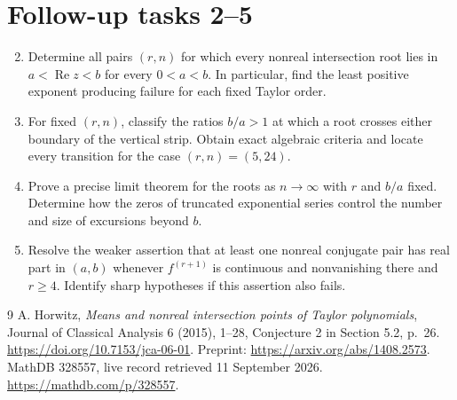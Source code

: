\documentclass[11pt]{article}
\begin{document}
\section{Follow-up tasks 2--5}
\begin{enumerate}
\setcounter{enumi}{1}
\renewcommand{\labelenumi}{\textbf{Task \arabic{enumi}.}}
\item Determine all pairs $(r,n)$ for which every nonreal intersection root
lies in $a<\operatorname{Re}z<b$ for every $0<a<b$. In particular, find the
least positive exponent producing failure for each fixed Taylor order.
\item For fixed $(r,n)$, classify the ratios $b/a>1$ at which a root crosses
either boundary of the vertical strip. Obtain exact algebraic criteria and
locate every transition for the case $(r,n)=(5,24)$.
\item Prove a precise limit theorem for the roots as $n\to\infty$ with $r$
and $b/a$ fixed. Determine how the zeros of truncated exponential series
control the number and size of excursions beyond $b$.
\item Resolve the weaker assertion that at least one nonreal conjugate pair
has real part in $(a,b)$ whenever $f^{(r+1)}$ is continuous and nonvanishing
there and $r\geq4$. Identify sharp hypotheses if this assertion also fails.
\end{enumerate}

\begin{thebibliography}{9}
 A. Horwitz, \emph{Means and nonreal intersection points of
Taylor polynomials}, Journal of Classical Analysis 6 (2015), 1--28,
Conjecture 2 in Section 5.2, p.~26.
\url{https://doi.org/10.7153/jca-06-01}.
Preprint: \url{https://arxiv.org/abs/1408.2573}.
 MathDB 328557, live record retrieved 11 September 2026.
\url{https://mathdb.com/p/328557}.
\end{thebibliography}
\end{document}
